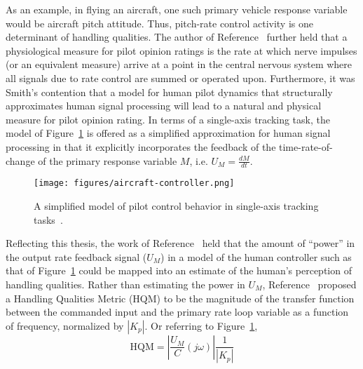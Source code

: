 \documentclass{bmd2016p}
\begin{document}
As an example, in flying an aircraft, one such primary vehicle response variable
would be aircraft pitch attitude. Thus, pitch-rate control activity is one
determinant of handling qualities. The author of Reference~\cite{Smith1976}
further held that a physiological measure for pilot opinion ratings is the rate
at which nerve impulses (or an equivalent measure) arrive at a point in the
central nervous system where all signals due to rate control are summed or
operated upon. Furthermore, it was Smith's contention that a model for human
pilot dynamics that structurally approximates human signal processing will lead
to a natural and physical measure for pilot opinion rating. In terms of a
single-axis tracking task, the model of Figure~\ref{fig:aircraft-controller} is
offered as a simplified approximation for human signal processing in that it
explicitly incorporates the feedback of the time-rate-of-change of the primary
response variable $M$, i.e. $U_M = \frac{dM}{dt}$.
%
\begin{figure}
  \centering
  \texttt{[image: figures/aircraft-controller.png]}
  \caption{A simplified model of pilot control behavior in single-axis tracking tasks~\cite{Hess2006}.}
  \label{fig:aircraft-controller}
\end{figure}

Reflecting this thesis, the work of Reference~\cite{Hess2006} held that the
amount of ``power'' in the output rate feedback signal ($U_M$) in a model of
the human controller such as that of Figure~\ref{fig:aircraft-controller} could
be mapped into an estimate of the human's perception of handling qualities.
Rather than estimating the power in $U_M$, Reference~\cite{Hess2006} proposed a Handling Qualities Metric (HQM) to be the magnitude of the transfer function between the commanded input and the primary rate loop variable as a function of frequency, normalized by $|K_p|$. Or referring to Figure~\ref{fig:aircraft-controller},
%
\begin{equation}
  \textrm{HQM} = \left| \frac{U_M}{C}(j\omega) \right| \frac{1}{|K_p|}
  \label{eq:hqm-def}
\end{equation}
\end{document}

